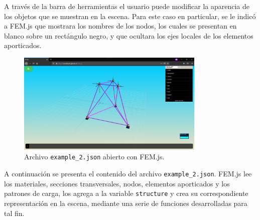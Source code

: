 A través de la barra de herramientas el usuario puede modificar la aparencia de los objetos que se muestran en la escena. Para este caso en particular, se le indicó a FEM.js que mostrara los nombres de los nodos, los cuales se presentan en blanco sobre un rectángulo negro, y que ocultara los ejes locales de los elementos aporticados.\\

\begin{figure}[ht]
  \centering
  \includegraphics[width=0.8\textwidth]{FEM.js/FEM.js-example_2.png}
  \caption{Archivo \texttt{example\_2.json} abierto con FEM.js.}
  \label{fig:FEM.js-example_2}
\end{figure}

A continuación se presenta el contenido del archivo \verb|example_2.json|. FEM.js lee los materiales, secciones transversales, nodos, elementos aporticados y los patrones de carga, los agrega a la variable \verb|structure| y crea su correspondiente representación en la escena, mediante una serie de funciones desarrolladas para tal fin.\\

